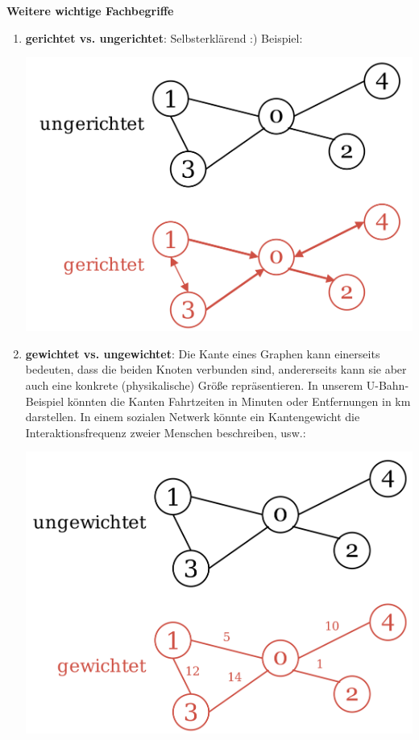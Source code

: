 \documentclass{article}
\begin{document}
\vspace{2mm}
\textbf{Weitere wichtige Fachbegriffe}
\begin{enumerate}
    \item \textbf{gerichtet vs. ungerichtet}: Selbsterklärend :) Beispiel:\begin{center}
        \includegraphics[scale=0.15]{../media/ungerichtet_gerichtet.png}
    \end{center}
    \item \textbf{gewichtet vs. ungewichtet}: Die Kante eines Graphen kann einerseits bedeuten, dass die beiden Knoten  verbunden sind, andererseits kann sie aber auch eine konkrete (physikalische) Größe repräsentieren. In unserem U-Bahn-Beispiel könnten die Kanten Fahrtzeiten in Minuten oder Entfernungen in km darstellen. In einem sozialen Netwerk könnte ein Kantengewicht die Interaktionsfrequenz zweier Menschen beschreiben, usw.: \begin{center}
        \includegraphics[scale=0.15]{../media/gewichtet.png}

\end{center}
\end{enumerate}
\end{document}
